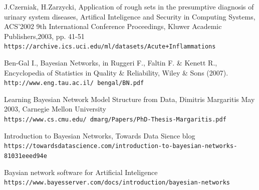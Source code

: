 \documentclass{article}
\begin{document}
\newpage
\begin{thebibliography}{9}

J.Czerniak, H.Zarzycki, Application of rough sets in the presumptive diagnosis of urinary system diseases, 
Artifical Inteligence and Security in Computing Systems, ACS'2002 9th International Conference Proceedings, 
Kluwer Academic Publishers,2003, pp. 41-51 
\\\texttt{https://archive.ics.uci.edu/ml/datasets/Acute+Inflammations}

Ben-Gal I., Bayesian Networks, in Ruggeri F., Faltin F. \& Kenett R.,
Encyclopedia of Statistics in Quality \& Reliability, Wiley \& Sons (2007). 
\\\texttt{http://www.eng.tau.ac.il/~bengal/BN.pdf}

Learning Bayesian Network Model Structure from Data, Dimitris Margaritis
May 2003, Carnegie Mellon University
\\\texttt{https://www.cs.cmu.edu/~dmarg/Papers/PhD-Thesis-Margaritis.pdf}

Introduction to Bayesian Networks, Towards Data Sience blog
\\\texttt{https://towardsdatascience.com/introduction-to-bayesian-networks-81031eeed94e}

Baysian network software for Artificial Inteligence
\\\texttt{https://www.bayesserver.com/docs/introduction/bayesian-networks}

\end{thebibliography}
\newpage

\listoffigures
\newpage
\end{document}

